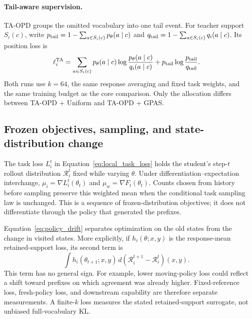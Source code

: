 \paragraph{Tail-aware supervision.}
TA-OPD \citep{huang2026tailaware} groups the omitted vocabulary
into one tail event. For teacher support $S_i(c)$, write
$p_{\rm tail}=1-\sum_{a\in S_i(c)}p_\theta(a\mid c)$ and
$q_{\rm tail}=1-\sum_{a\in S_i(c)}q_i(a\mid c)$. Its position loss is
\begin{equation}
    \ell_i^{\rm TA}=
       \sum_{a\in S_i(c)}p_\theta(a\mid c)
                     \log\frac{p_\theta(a\mid c)}{q_i(a\mid c)}
       +p_{\rm tail}\log\frac{p_{\rm tail}}{q_{\rm tail}}.
\end{equation}
Both runs use $k=64$, the same response averaging and fixed task
weights, and the same training budget as the core comparison.
Only the allocation differs between TA-OPD + Uniform and
TA-OPD + GPAS.

\subsection{Frozen objectives, sampling, and state-distribution change}
\label{app:local_objective}

The task loss $L_i^t$ in Equation~\ref{eq:local_task_loss} holds the
student's step-$t$ rollout distribution $\mathcal R_i^t$ fixed while
varying $\theta$. Under differentiation--expectation interchange,
$\mu_i=\nabla L_i^t(\theta_t)$ and
$\mu_w=\nabla F_t(\theta_t)$. Counts chosen from history before sampling
preserve this weighted mean when the conditional task sampling
law is unchanged. This is a sequence of frozen-distribution objectives;
it does not differentiate through the policy that generated the prefixes.

Equation~\ref{eq:policy_drift} separates optimization on the old states
from the change in visited states. More explicitly, if
$h_i(\theta;x,y)$ is the response-mean retained-support loss, its second
term is
\begin{equation}
    \int h_i(\theta_{t+1};x,y)\,
          d(\mathcal R_i^{t+1}-\mathcal R_i^t)(x,y).
\end{equation}
This term has no general sign. For example, lower moving-policy loss
could reflect a shift toward prefixes on which agreement was already
higher. Fixed-reference loss, fresh-policy loss, and downstream
capability are therefore separate measurements. A finite-$k$ loss
measures the stated retained-support surrogate, not unbiased
full-vocabulary KL.

